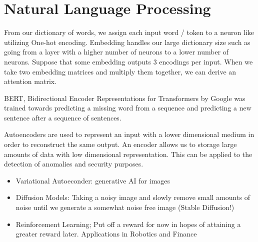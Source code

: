 \documentclass{article}
\begin{document}
\section{Natural Language Processing}
From our dictionary of words, we assign each input word / token to a neuron like utilizing One-hot encoding. 
Embedding handles our large dictionary size such as going from a layer with a higher number of neurons to a lower number of neurons. Suppose that some embedding outputs 3 encodings per input. When we take two embedding matrices and multiply them together, we can derive an attention matrix. 

BERT, Bidirectional Encoder Representations for Transformers by Google was trained towards predicting a missing word from a sequence and predicting a new sentence after a sequence of sentences. 

Autoencoders are used to represent an input with a lower dimensional medium in order to reconstruct the same output. An encoder allows us to storage large amounts of data with low dimensional representation. This can be applied to the detection of anomalies and security purposes. 
\begin{itemize}
    \item Variational Autoeconder: generative AI for images
    \item Diffusion Models: Taking a noisy image and slowly remove small amounts of noise until we generate a somewhat noise free image (Stable Diffusion!)
    \item Reinforcement Learning; Put off a reward for now in hopes of attaining a greater reward later. Applications in Robotics and Finance
\end{itemize}
\end{document}

